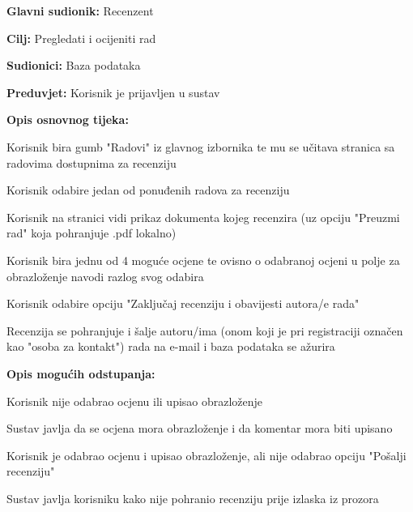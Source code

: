 				
					\noindent {}
					\begin{packed_item}
						
						\item \textbf{Glavni sudionik:} Recenzent
						\item \textbf{Cilj:} Pregledati i ocijeniti rad
						\item \textbf{Sudionici:} Baza podataka
						\item \textbf{Preduvjet:} Korisnik je prijavljen u sustav
						\item \textbf{Opis osnovnog tijeka:} 
						
						\item[] \begin{packed_enum}
							\item Korisnik bira gumb "Radovi" iz glavnog izbornika te mu se učitava stranica sa radovima dostupnima za recenziju
							\item Korisnik odabire jedan od ponuđenih radova za recenziju
							\item  Korisnik na stranici vidi prikaz dokumenta kojeg recenzira (uz opciju "Preuzmi rad" koja pohranjuje .pdf lokalno)
							\item Korisnik bira jednu od 4 moguće ocjene te ovisno o odabranoj ocjeni u polje za obrazloženje navodi razlog svog odabira
							\item Korisnik odabire opciju "Zaključaj recenziju i obavijesti autora/e rada"
							\item Recenzija se pohranjuje i šalje autoru/ima (onom koji je pri registraciji označen kao "osoba za kontakt") rada na e-mail i baza podataka se ažurira
						\end{packed_enum}
					
						\item \textbf{Opis mogućih odstupanja:}
						
						\item[] \begin{packed_enum}
							\item[4.a] Korisnik nije odabrao ocjenu ili upisao obrazloženje
							\item[] \begin{packed_enum}
								\item[1.] Sustav javlja da se ocjena mora obrazloženje i da komentar mora biti upisano
							\end{packed_enum}
							\item[4.b] Korisnik je odabrao ocjenu i upisao obrazloženje, ali nije odabrao opciju "Pošalji recenziju"
							\item[] \begin{packed_enum}
								\item[1.] Sustav javlja korisniku kako nije pohranio recenziju prije izlaska iz prozora
							\end{packed_enum}
						\end{packed_enum}
					
					\end{packed_item}
				
